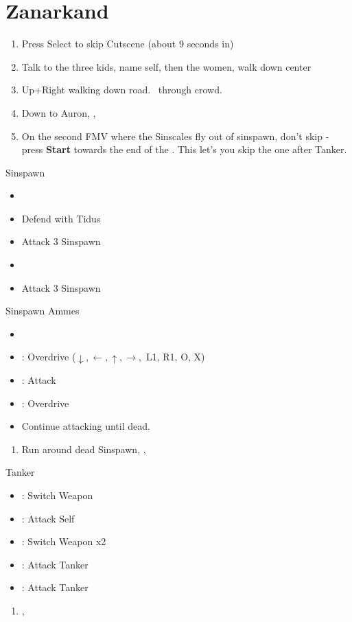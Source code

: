 \chapter{Zanarkand}\label{ch:zanarkand}

\begin{enumerate}
	\item Press Select to skip Cutscene (about 9 seconds in)
	\item Talk to the three kids, name self, then the women, walk down center
	\item Up+Right walking down road. \sd \ through crowd. \skippablefmv
	\item Down to Auron, \sd, \skippablefmv
	\item On the second FMV where the Sinscales fly out of sinspawn, don't skip - press \textbf{Start} towards the end of the \fmv. This let's you skip the one after Tanker. \sd
\end{enumerate}
\begin{battle}{Sinspawn}
	\begin{itemize}
		\item \sd
		\item Defend with Tidus
		\item Attack 3 Sinspawn
		\item \sd
		\item Attack 3 Sinspawn
	\end{itemize}
\end{battle}
\begin{battle}[2400]{Sinspawn Ammes}
	\begin{itemize}
		\item \sd
		\item \auron: Overdrive ($\downarrow, \leftarrow, \uparrow, \rightarrow,$ L1, R1, O, X)
		\item \tidus: Attack
		\item \tidus: Overdrive
		\item Continue attacking until dead.
	\end{itemize}
\end{battle}
\begin{enumerate}[resume]
	\item Run around dead Sinspawn, \save, \sd
\end{enumerate}
\begin{battle}[1000]{Tanker}
	\begin{itemize}
		\item \tidus: Switch Weapon
		\item \auron: Attack Self
		\item \tidus: Switch Weapon x2
		\item \tidus: Attack Tanker
		\item \auron: Attack Tanker
	\end{itemize}
\end{battle}
\begin{enumerate}[resume]
	\item \cs[2:00], \skippablefmv
\end{enumerate}